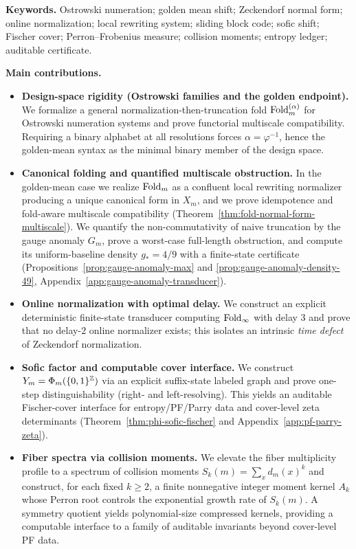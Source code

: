 \noindent\textbf{Keywords.}
Ostrowski numeration; golden mean shift; Zeckendorf normal form; online normalization; local rewriting system; sliding block code; sofic shift; Fischer cover; Perron--Frobenius measure; collision moments; entropy ledger; auditable certificate.

\bigskip
\noindent\textbf{Main contributions.}
\begin{itemize}
  \item \textbf{Design-space rigidity (Ostrowski families and the golden endpoint).} We formalize a general normalization-then-truncation fold $\mathrm{Fold}_m^{(\alpha)}$ for Ostrowski numeration systems and prove functorial multiscale compatibility. Requiring a binary alphabet at all resolutions forces $\alpha=\varphi^{-1}$, hence the golden-mean syntax as the minimal binary member of the design space.
  \item \textbf{Canonical folding and quantified multiscale obstruction.} In the golden-mean case we realize $\mathrm{Fold}_m$ as a confluent local rewriting normalizer producing a unique canonical form in $X_m$, and we prove idempotence and fold-aware multiscale compatibility (Theorem~\ref{thm:fold-normal-form-multiscale}). We quantify the non-commutativity of naive truncation by the gauge anomaly $G_m$, prove a worst-case full-length obstruction, and compute its uniform-baseline density $g_\ast=4/9$ with a finite-state certificate (Propositions~\ref{prop:gauge-anomaly-max} and \ref{prop:gauge-anomaly-density-49}, Appendix~\ref{app:gauge-anomaly-transducer}).
  \item \textbf{Online normalization with optimal delay.} We construct an explicit deterministic finite-state transducer computing $\mathrm{Fold}_\infty$ with delay $3$ and prove that no delay-$2$ online normalizer exists; this isolates an intrinsic \emph{time defect} of Zeckendorf normalization.
  \item \textbf{Sofic factor and computable cover interface.} We construct $Y_m=\Phi_m(\{0,1\}^{\mathbb{Z}})$ via an explicit suffix-state labeled graph and prove one-step distinguishability (right- and left-resolving). This yields an auditable Fischer-cover interface for entropy/PF/Parry data and cover-level zeta determinants (Theorem~\ref{thm:phi-sofic-fischer} and Appendix~\ref{app:pf-parry-zeta}).
  \item \textbf{Fiber spectra via collision moments.} We elevate the fiber multiplicity profile to a spectrum of collision moments $S_k(m)=\sum_x d_m(x)^k$ and construct, for each fixed $k\ge 2$, a finite nonnegative integer moment kernel $A_k$ whose Perron root controls the exponential growth rate of $S_k(m)$. A symmetry quotient yields polynomial-size compressed kernels, providing a computable interface to a family of auditable invariants beyond cover-level PF data.

\end{itemize}
